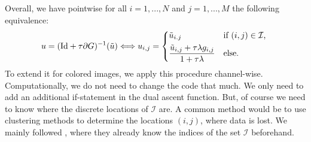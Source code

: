 \documentclass{scrreprt}
\begin{document}
        Overall, we have pointwise for all $i = 1, ..., N$ and $j = 1, ..., M$ the following equivalence:
            \begin{equation}
                u = (\textnormal{Id} + \tau \partial G)^{-1}(\tilde{u}) \Longleftrightarrow u_{i,j} =
                \begin{dcases*}
                    \tilde{u}_{i.j} & \textnormal{if $(i,j) \in \mathcal{I}$}, \\
                    \frac{\tilde{u}_{i,j} + \tau \lambda g_{i,j}}{1 + \tau\lambda} & \textnormal{else.}
                \end{dcases*}
            \end{equation}
        To extend it for colored images, we apply this procedure channel-wise. Computationally, we do not need to change the code that much. We only need to add an additional if-statement in the dual ascent function. But, of course we need to know where the discrete locations of $\mathcal{I}$ are. A common method would be to use clustering methods to determine the locations $(i,j)$, where data is lost. We mainly followed \cite{Chambolle10afirst-order}, where they already know the indices of the set $\mathcal{I}$ beforehand.
\end{document}
